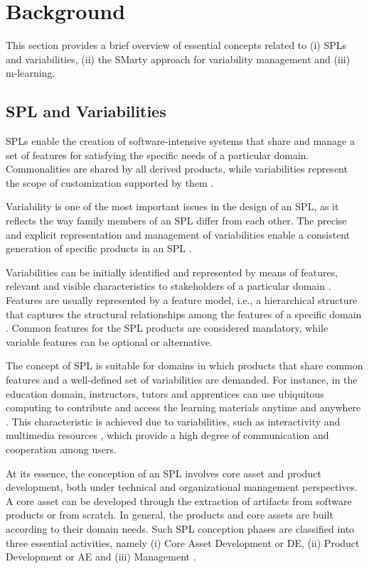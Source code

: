 \section{Background}\label{section2}

This section provides a brief overview of essential concepts related to (i) SPLs and variabilities, (ii) the SMarty approach for variability management and (iii) m-learning.

\subsection{SPL and Variabilities}

SPLs enable the creation of software-intensive systems that share and manage a set of features for satisfying the specific needs of a particular domain. Commonalities are shared by all derived products, while variabilities represent the scope of customization supported by them \cite{bockle05,vanderlinden07}.

Variability is one of the most important issues in the design of an SPL, as it reflects the way family members of an SPL differ from each other. The precise and explicit representation and management of variabilities enable a consistent generation of specific products in an SPL \cite{chen11,capilla13}. 

Variabilities can be initially identified and represented by means of features, relevant and visible characteristics to stakeholders of a particular domain \cite{bosch01}. Features are usually represented by a feature model, i.e., a hierarchical structure that captures the structural relationships among the features of a specific domain \cite{bockle05,vanderlinden07}. Common features for the SPL products are considered mandatory, while variable features can be optional or alternative.


The concept of SPL is suitable for domains in which products that share common features and a well-defined set of variabilities are demanded. For instance, in the education domain, instructors, tutors and apprentices can use ubiquitous computing to contribute and access the learning materials anytime and anywhere \cite{kukulska05}. This characteristic is achieved due to variabilities, such as interactivity and multimedia resources \cite{falvojr14a,falvojr14b}, which provide a high degree of communication and cooperation among users.

At its essence, the conception of an SPL involves core asset and product development, both under technical and organizational management perspectives. A core asset can be developed through the extraction of artifacts from software products or from scratch. In general, the products and core assets are built according to their domain needs. Such SPL conception phases are classified into three essential activities, namely (i) Core Asset Development or DE, (ii) Product Development or AE and (iii) Management \cite{bockle05,vanderlinden07}.

